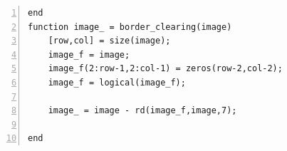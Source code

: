 \documentclass[11pt,oneside]{book}
\begin{document}
\begin{appendices}
\begin{lstlisting}[numbers=left, numberstyle=\tiny,keywordstyle=\color{blue!70},commentstyle=\color{red!50!green!50!blue!50},frame=shadowbox, rulesepcolor=\color{red!20!green!20!blue!20}]
end
function image_ = border_clearing(image)
    [row,col] = size(image);
    image_f = image;
    image_f(2:row-1,2:col-1) = zeros(row-2,col-2);
    image_f = logical(image_f);
    
    image_ = image - rd(image_f,image,7);
    
end
\end{lstlisting}




\end{appendices}
\end{document}
